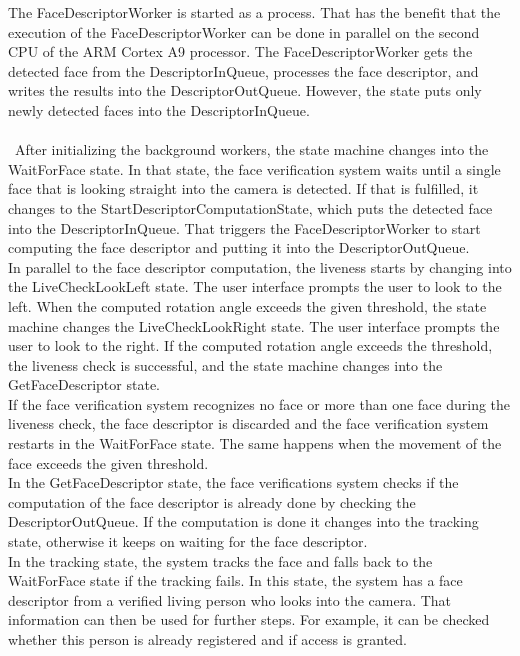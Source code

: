 \documentclass[%
a4paper,
twoside,
openany,
dvipsnames
]
{report}
\begin{document}
The FaceDescriptorWorker is started as a process. That has the benefit that the execution of the FaceDescriptorWorker can be done in parallel on the second \gls{CPU} of the ARM Cortex A9 processor. The FaceDescriptorWorker gets the detected face from the DescriptorInQueue, processes the face descriptor, and writes the results into the DescriptorOutQueue. However, the state puts only newly detected faces into the DescriptorInQueue. \\
\\\
After initializing the background workers, the state machine changes into the WaitForFace state. In that state, the face verification system waits until a single face that is looking straight into the camera is detected. If that is fulfilled, it changes to the StartDescriptorComputationState, which puts the detected face into the DescriptorInQueue. That triggers the FaceDescriptorWorker to start computing the face descriptor and putting it into the DescriptorOutQueue. \\
In parallel to the face descriptor computation, the liveness starts by changing into the LiveCheckLookLeft state. The user interface prompts the user to look to the left. When the computed rotation angle exceeds the given threshold, the state machine changes the LiveCheckLookRight state. The user interface prompts the user to look to the right. If the computed rotation angle exceeds the threshold, the liveness check is successful, and the state machine changes into the GetFaceDescriptor state. \\
If the face verification system recognizes no face or more than one face during the liveness check, the face descriptor is discarded and the face verification system restarts in the WaitForFace state. The same happens when the movement of the face exceeds the given threshold. \\
In the GetFaceDescriptor state, the face verifications system checks if the computation of the face descriptor is already done by checking the DescriptorOutQueue. If the computation is done it changes into the tracking state, otherwise it keeps on waiting for the face descriptor. \\
In the tracking state, the system tracks the face and falls back to the WaitForFace state if the tracking fails. In this state, the system has a face descriptor from a verified living person who looks into the camera. That information can then be used for further steps. For example, it can be checked whether this person is already registered and if access is granted.
\end{document}
